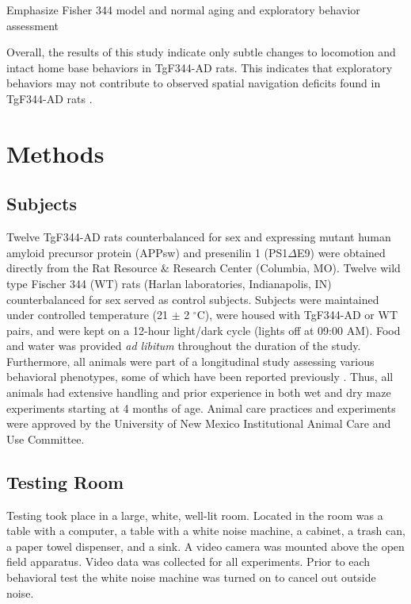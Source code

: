 \documentclass[fleqn,10pt]{wlscirep}
\begin{document}
Emphasize Fisher 344 model and normal aging and exploratory behavior assessment

Overall, the results of this study indicate only subtle changes to locomotion and intact home base behaviors in TgF344-AD rats. This indicates that exploratory behaviors may not contribute to observed spatial navigation deficits found in TgF344-AD rats \cite{berkowitz_progressive_2018}. 

\section*{Methods}

\subsection*{Subjects} 
Twelve TgF344-AD rats counterbalanced for sex and expressing mutant human amyloid precursor protein (APPsw) and presenilin 1 (PS1$\Delta$E9) were obtained directly from the Rat Resource \& Research Center (Columbia, MO). Twelve wild type Fischer 344 (WT) rats (Harlan laboratories, Indianapolis, IN) counterbalanced for sex served as control subjects. Subjects were maintained under controlled temperature (21 $\pm$ 2 $^{\circ}$C), were housed with TgF344-AD or WT pairs, and were kept on a 12-hour light/dark cycle (lights off at 09:00 AM). Food and water was provided \textit{ad libitum} throughout the duration of the study. Furthermore, all animals were part of a longitudinal study assessing various behavioral phenotypes, some of which have been reported previously \cite{berkowitz_progressive_2018,pentkowski_anxiety-like_2018}. Thus, all animals had extensive handling and prior experience in both wet and dry maze experiments starting at 4 months of age. Animal care practices and experiments were approved by the University of New Mexico Institutional Animal Care and Use Committee.

\subsection*{Testing Room}
Testing took place in a large, white, well-lit room. Located in the room was a table with a computer, a table with a white noise machine, a cabinet, a trash can, a paper towel dispenser, and a sink. A video camera was mounted above the open field apparatus. Video data was collected for all experiments. Prior to each behavioral test the white noise machine was turned on to cancel out outside noise.
\end{document}
